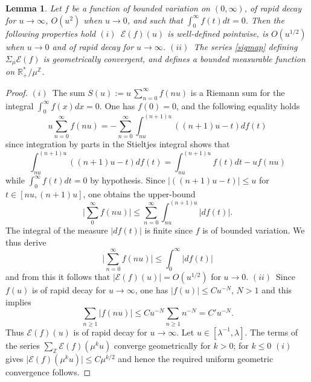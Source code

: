 \documentclass[cupthm]{CUP-JNL-JMJ}
\def\R{{\mathbb R}}
\def\Z{{\mathbb Z}}
\def\cE{{\mathcal E}}
\numberwithin{equation}{section}
\theoremstyle{cupplain}
\newtheorem{lemma}[theorem]{Lemma}
\theoremstyle{cupdefinition}
\theoremstyle{cupremark}
\theoremstyle{cupproof}
\newtheorem{proof}{Proof}
\begin{document}
\begin{lemma}\label{fouriertruncated1} Let $f$ be a function of bounded variation on $(0,\infty)$, of rapid decay for $u\to \infty$,  $O(u^2)$ when $ u\to 0$, and such that $\int_0^{\infty}f(t)dt=0$. Then the following properties hold \newline
$(i)$~$\cE(f)(u)$ is well-defined pointwise, is 
$O(u^{1/2})$ when $u\to 0$ and of rapid decay for $u\to\infty$.\newline
$(ii)$~The series \eqref{sigmap} defining $\Sigma_\mu\cE(f)$ is geometrically convergent, and defines a bounded measurable  function on  $\R_+^*/\mu^{\Z}$.
\end{lemma}
\begin{proof} $(i)$~The sum $S(u):=u\,\displaystyle{\sum_{n=0}^\infty} f(nu)$ is a Riemann sum for the integral $\int_0^{\infty}f(x)dx=0$. One has $f(0)=0$, and the following equality holds
$$
u\sum_{n=0}^{\infty} f(nu)=- \sum_{n=0}^{\infty}\int_{n u}^{(n+1)u}((n+1)u-t)df(t)
$$
since integration by parts in the Stieltjes integral shows that 
$$
\int_{n u}^{(n+1)u}((n+1)u-t)df(t)=\int_{n u}^{(n+1)u}f(t)dt-uf(nu)
$$
while $\int_0^{\infty}f(t)dt=0$ by hypothesis.
Since $\vert ((n+1)u-t)\vert \leq u$ for $t\in [nu, (n+1)u]$, one obtains the upper-bound
$$
{\bigg|} \sum_0^{\infty} f(nu){\bigg|} \leq {\sum_{n=0}^{\infty}}\int_{n u}^{(n+1)u}\vert df(t)\vert.
$$
The integral of the measure $\vert df(t)\vert$ is finite since $f$ is of bounded variation. We thus derive 
$$
{\bigg|} {\sum_{n=0}^{\infty}} f(nu){\bigg|} \leq \int_0^\infty \vert df(t)\vert 
$$
and {from this} it follows that $\vert\cE(f)(u)\vert =O(u^{1/2})$ for $u\to 0$.\newline
$(ii)$~Since $f(u)$ is of rapid decay for $u\to \infty$, one has $\vert f(u)\vert\leq Cu^{-N}$, $N>1$ and {this implies}
$$
\sum_{n\geq 1} \vert f(nu)\vert \leq Cu^{-N}\sum_{n\geq 1}n^{-N}=C'u^{-N}{.}
$$ 
Thus $\cE(f)(u)$ is of rapid decay for $u\to \infty$. Let $u\in [\lambda^{-1},\lambda]$. 
The terms of the  series ${\displaystyle{\sum_\Z \cE(f)}}(\mu^ku)$ converge geometrically for $k>0$;  for $k\leq 0$  $(i)$ gives  $\vert \cE(f)(\mu^ku)\vert\leq C \mu^{k/2} $ and hence  the required uniform geometric convergence follows. \end{proof}
\end{document}
